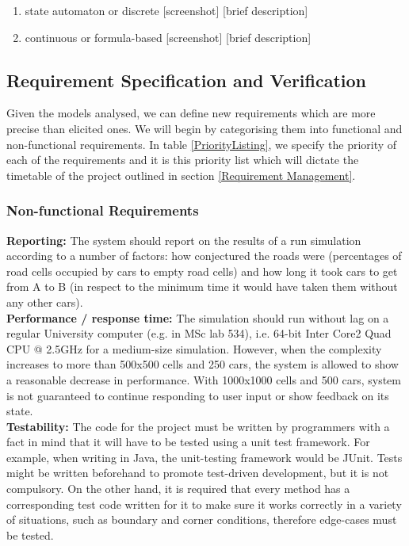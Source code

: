 \documentclass{article}
\begin{document}
\begin{enumerate}
	
	\item state automaton or discrete
	[screenshot] [brief description]
	\item continuous or formula-based
	[screenshot] [brief description]

\end{enumerate}

\subsection{Requirement Specification and Verification}

Given the models analysed, we can define new requirements which are more precise than elicited ones. We will begin by categorising them into functional and non-functional requirements. In table \ref{PriorityListing}, we specify the priority of each of the requirements and it is this priority list which will dictate the timetable of the project outlined in section \ref{Requirement Management}.\\

\subsubsection{Non-functional Requirements}
\textbf{Reporting:} The system should report on the results of a run simulation according to a number of factors: how conjectured the roads were (percentages of road cells occupied by cars to empty road cells) and how long it took cars to get from A to B (in respect to the minimum time it would have taken them without any other cars).\\

\noindent
\textbf{Performance / response time:} The simulation should run without lag on a regular University computer (e.g. in MSc lab 534), i.e. 64-bit Inter Core2 Quad CPU @ 2.5GHz for a medium-size simulation. 
However, when the complexity increases to more than 500x500 cells and 250 cars, the system is allowed to show a reasonable decrease in performance. 
With 1000x1000 cells and 500 cars, system is not guaranteed to continue responding to user input or show feedback on its state.\\

\noindent
\textbf{Testability:} The code for the project must be written by programmers with a fact in mind that it will have to be tested using a unit test framework. For example, when writing in Java, the unit-testing framework would be JUnit. 
Tests might be written beforehand to promote test-driven development, but it is not compulsory. 
On the other hand, it is required that every method has a corresponding test code written for it to make sure it works correctly in a variety of situations, such as boundary and corner conditions, therefore edge-cases must be tested.\\
\end{document}
